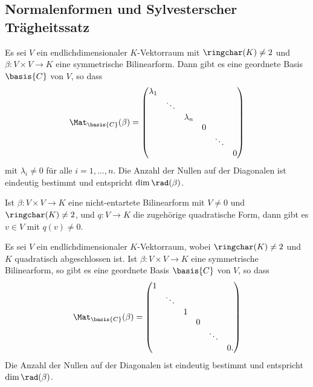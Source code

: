 \subsection{Normalenformen und Sylvesterscher Trägheitssatz}


\begin{theorem}
  Es sei $V$ ein endlichdimensionaler $K$-Vektorraum mit $\ringchar(K) \neq 2$ und $\beta \colon V \times V \to K$ eine symmetrische Bilinearform.
  Dann gibt es eine geordnete Basis $\basis{C}$ von $V$, so dass
  \[
    \Mat_\basis{C}(\beta)
    =
    \begin{pmatrix}
      \lambda_1 &         &           &   &         &   \\
                & \ddots  &           &   &         &   \\
                &         & \lambda_n &   &         &   \\
                &         &           & 0 &         &   \\
                &         &           &   & \ddots  &   \\
                &         &           &   &         & 0
    \end{pmatrix}
  \]
  mit $\lambda_i \neq 0$ für alle $i = 1, \dotsc, n$.
  Die Anzahl der Nullen auf der Diagonalen ist eindeutig bestimmt und entspricht $\dim \rad(\beta)$.
\end{theorem}


\begin{lemma}
  Ist $\beta \colon V \times V \to K$ eine nicht-entartete Bilinearform mit $V \neq 0$ und $\ringchar(K) \neq 2$, und $q \colon V \to K$ die zugehörige quadratische Form, dann gibt es $v \in V$ mit $q(v) \neq 0$.
\end{lemma}


\begin{corollary}
  Es sei $V$ ein endlichdimensionaler $K$-Vektorraum, wobei $\ringchar(K) \neq 2$ und $K$ quadratisch abgeschlossen ist.
  Ist $\beta \colon V \times V \to K$ eine symmetrische Bilinearform, so gibt es eine geordnete Basis $\basis{C}$ von $V$, so dass
  \[
    \Mat_\basis{C}(\beta)
    =
    \begin{pmatrix}
      1 &         &   &   &         &   \\
        & \ddots  &   &   &         &   \\
        &         & 1 &   &         &   \\
        &         &   & 0 &         &   \\
        &         &   &   & \ddots  &   \\
        &         &   &   &         & 0.
    \end{pmatrix}
  \]
  Die Anzahl der Nullen auf der Diagonalen ist eindeutig bestimmt und entspricht $\dim \rad(\beta)$.
\end{corollary}



